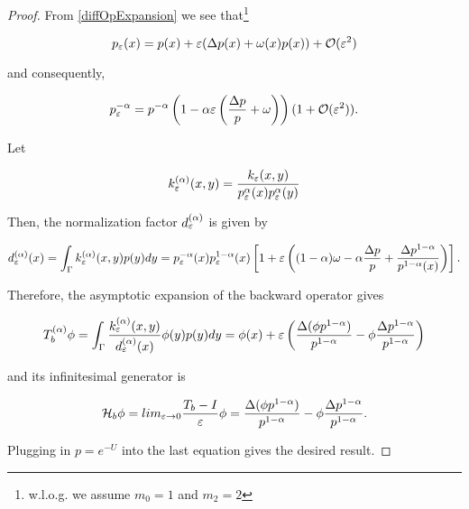 \begin{proof}
From \ref{diffOpExpansion} we see that\footnote{w.l.o.g. we assume $m_0=1$ and $m_2=2$} 

\begin{equation*}
p_\varepsilon(x)=p(x)+\varepsilon (\Delta p(x)+ \omega(x)p(x))+\mathcal{O}(\varepsilon^2)
\end{equation*}

and consequently,

\begin{equation*}
p_\varepsilon^{-\alpha}=p^{-\alpha}\left(1-\alpha\varepsilon \left(\frac{\Delta p}{p}+\omega \right) \right)(1+\mathcal{O}(\varepsilon^2)).
\end{equation*}

Let

\begin{equation*}
k_\varepsilon^{(\alpha)}(x,y)=\frac{k_\varepsilon(x,y)}{p_\varepsilon^{\alpha}(x)p_\varepsilon^{\alpha}(y)}
\end{equation*}

Then, the normalization factor $d_\varepsilon^{(\alpha)}$ is given by

\begin{equation*}
d_\varepsilon^{(\alpha)}(x)=\int_\Gamma k_\varepsilon^{(\alpha)}(x,y)p(y)dy = 
p_\varepsilon^{-\alpha}(x)p_\varepsilon^{1-\alpha}(x)\left[1+\varepsilon \left((1-\alpha)\omega - \alpha\frac{\Delta p}{p}+\frac{\Delta p^{1-\alpha}}{p^{1-\alpha}(x)} \right) \right].
\end{equation*}

Therefore, the asymptotic expansion of the backward operator gives

\begin{equation*}
T_b^{(\alpha)}\phi = \int_\Gamma \frac{k_\varepsilon^{(\alpha)}(x,y)}{d_\varepsilon^{(\alpha)}(x)}\phi(y)p(y)dy = \phi(x) + \varepsilon\left(\frac{\Delta(\phi p^{1-\alpha})}{p^{1-\alpha}}-\phi \frac{\Delta p^{1-\alpha}}{p^{1-\alpha}} \right)
\end{equation*}

and its infinitesimal generator is 

\begin{equation*}
\mathcal{H}_b\phi =
lim_{\varepsilon\rightarrow 0}\frac{T_b-I}{\varepsilon}\phi =
\frac{\Delta(\phi p^{1-\alpha})}{p^{1-\alpha}}-\phi \frac{\Delta p^{1-\alpha}}{p^{1-\alpha}}.
\end{equation*}

Plugging in $p=e^{-U}$ into the last equation gives the desired result.
\end{proof}





















